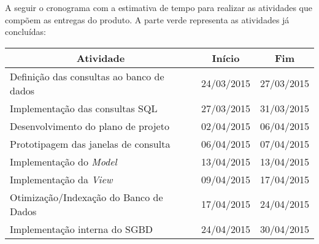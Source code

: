 \documentclass[a4paper,12pt]{article}
\begin{document}
A seguir o cronograma com a estimativa de tempo para realizar as atividades que compõem as entregas do produto. A parte verde representa as atividades já concluídas:\\


{\normalsize %

\begin{longtable}{|l|c|c|}
\hline
\multicolumn{1}{|c|}{\textbf{Atividade}}  & \multicolumn{1}{c|}{\textbf{Início}} & \multicolumn{1}{c|}{\textbf{Fim}} \\ \hline

\hline
\rowcolor{electricgreen}
Definição das consultas ao banco de dados & 24/03/2015                           & 27/03/2015                        \\ \hline

\hline
\rowcolor{electricgreen}
Implementação das consultas SQL           & 27/03/2015                           & 31/03/2015                        \\ \hline

\hline
\rowcolor{electricgreen}
Desenvolvimento do plano de projeto       & 02/04/2015                           & 06/04/2015                        \\ 

\hline
\rowcolor{electricgreen}
Prototipagem das janelas de consulta      & 06/04/2015                           & 07/04/2015                        \\ \hline

\hline
\rowcolor{electricgreen}
Implementação do \textit{Model}           & 13/04/2015                           & 13/04/2015                        \\ \hline

\hline
\rowcolor{electricgreen}
Implementação da \textit{View}            & 09/04/2015                           & 17/04/2015                        \\ \hline

\hline
\rowcolor{electricgreen}
Otimização/Indexação do Banco de Dados    & 17/04/2015                           & 24/04/2015                        \\ \hline


Implementação interna do SGBD             & 24/04/2015                           & 30/04/2015                        \\ \hline



\end{longtable}}
\end{document}
